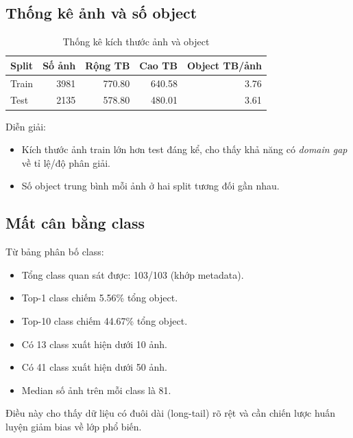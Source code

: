 \subsection{Thống kê ảnh và số object}
\begin{table}[H]
    \centering
    \caption{Thống kê kích thước ảnh và object}
    \begin{tabular}{lrrrr}
        \toprule
        Split & Số ảnh & Rộng TB & Cao TB & Object TB/ảnh \\
        \midrule
        Train & 3981 & 770.80 & 640.58 & 3.76 \\
        Test  & 2135 & 578.80 & 480.01 & 3.61 \\
        \bottomrule
    \end{tabular}
\end{table}

Diễn giải:
\begin{itemize}[leftmargin=1.5em]
    \item Kích thước ảnh train lớn hơn test đáng kể, cho thấy khả năng có \emph{domain gap} về tỉ lệ/độ phân giải.
    \item Số object trung bình mỗi ảnh ở hai split tương đối gần nhau.
\end{itemize}

\subsection{Mất cân bằng class}
Từ bảng phân bố class:
\begin{itemize}[leftmargin=1.5em]
    \item Tổng class quan sát được: 103/103 (khớp metadata).
    \item Top-1 class chiếm 5.56\% tổng object.
    \item Top-10 class chiếm 44.67\% tổng object.
    \item Có 13 class xuất hiện dưới 10 ảnh.
    \item Có 41 class xuất hiện dưới 50 ảnh.
    \item Median số ảnh trên mỗi class là 81.
\end{itemize}

Điều này cho thấy dữ liệu có đuôi dài (long-tail) rõ rệt và cần chiến lược huấn luyện giảm bias về lớp phổ biến.

